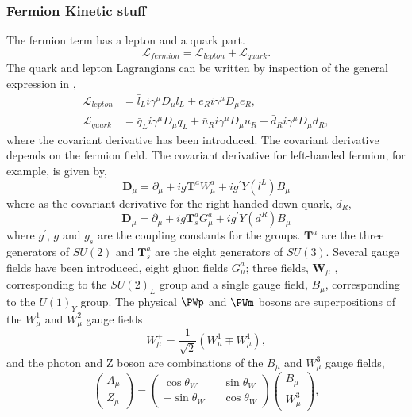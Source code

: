 \subsubsection{Fermion Kinetic stuff}
The fermion term has a lepton and a quark part.
\begin{equation}
\mathcal{L}_{fermion} =
 \mathcal{L}_{lepton}
+ \mathcal{L}_{quark}.
\end{equation}
The quark and lepton Lagrangians can be written by inspection of the general
expression in ,
\begin{align*}
\mathcal{L}_{lepton} &= 
\bar{l}_{L} i \gamma^{\mu} D_{\mu} l_{L} +
\bar{e}_{R} i \gamma^{\mu} D_{\mu} e_{R}, \\
\mathcal{L}_{quark} &= 
\bar{q}_{L} i \gamma^{\mu} D_{\mu} q_{L} +
\bar{u}_{R} i \gamma^{\mu} D_{\mu} u_{R} +
\bar{d}_{R} i \gamma^{\mu} D_{\mu} d_{R},
\end{align*}
where the covariant derivative has been introduced.
The covariant derivative depends on the fermion field. The covariant derivative
for left-handed fermion, for example, is given by,
\begin{equation}
\mathbf{D}_\mu 
= \partial_\mu 
+ ig\mathbf{T}^{a}W_{\mu}^{a}
+ ig^{\prime}Y(l^{L})B_{\mu}
\end{equation}
where as the covariant derivative for the right-handed down quark, $d_R$,
\begin{equation}
\mathbf{D}_\mu 
= \partial_\mu 
+ ig\mathbf{T}_{s}^{a}G_{\mu}^{a}
+ ig^{\prime}Y(d^{R})B_{\mu}
\end{equation}
where $g^\prime$, $g$ and $g_s$ are the coupling constants for the groups.
$\mathbf{T}^{a}$ are the three generators of $SU(2)$ and $\mathbf{T}^{a}_{s}$
are the eight generators of $SU(3)$. 
Several gauge fields have been introduced, eight gluon fields $G^{a}_{\mu}$;
three fields, $\mathbf{W}_{\mu}$ , corresponding to the $SU(2)_{L}$
group and a single gauge field, $B_{\mu}$, corresponding to the $U(1)_{Y}$ group.
The physical $\PWp$ and $\PWm$ bosons are superpositions of the $W^{1}_{\mu}$
and $W^{2}_{\mu}$ gauge fields
\begin{equation}
W^{\pm}_{\mu} = \frac{1}{\sqrt{2}} \left(W^{1}_{\mu} \mp W^{1}_{\mu}\right),
\label{eq:wgauge}
\end{equation}
and the photon and Z boson are combinations of the $B_{\mu}$ and $W^{3}_{\mu}$
gauge fields,
\begin{equation}
\left( \begin{matrix} A_{\mu}\\ Z_{\mu}\end{matrix}\right) =
\left( \begin{matrix} \cos\theta_{W} && \sin\theta_{W} \\  
                      -\sin\theta_{W} && \cos\theta_{W} \end{matrix}\right) 
\left( \begin{matrix} B_{\mu}\\ W^{3}_{\mu}\end{matrix}\right) ,
\label{eq:bgauge}
\end{equation}

